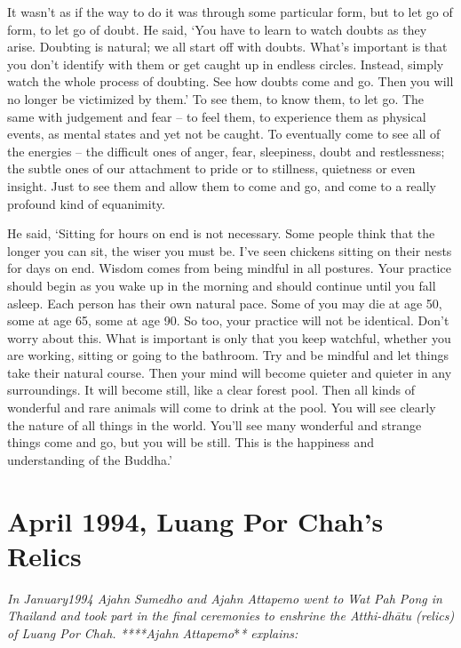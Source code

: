 It wasn't as if the way to do it was through some particular form, but
to let go of form, to let go of doubt. He said, `You have to learn to
watch doubts as they arise. Doubting is natural; we all start off with
doubts. What's important is that you don't identify with them or get
caught up in endless circles. Instead, simply watch the whole process of
doubting. See how doubts come and go. Then you will no longer be
victimized by them.' To see them, to know them, to let go. The same with
judgement and fear -- to feel them, to experience them as physical
events, as mental states and yet not be caught. To eventually come to
see all of the energies -- the difficult ones of anger, fear,
sleepiness, doubt and restlessness; the subtle ones of our attachment to
pride or to stillness, quietness or even insight. Just to see them and
allow them to come and go, and come to a really profound kind of
equanimity.

He said, `Sitting for hours on end is not necessary. Some people think
that the longer you can sit, the wiser you must be. I've seen chickens
sitting on their nests for days on end. Wisdom comes from being mindful
in all postures. Your practice should begin as you wake up in the
morning and should continue until you fall asleep. Each person has their
own natural pace. Some of you may die at age 50, some at age 65, some at
age 90. So too, your practice will not be identical. Don't worry about
this. What is important is only that you keep watchful, whether you are
working, sitting or going to the bathroom. Try and be mindful and let
things take their natural course. Then your mind will become quieter and
quieter in any surroundings. It will become still, like a clear forest
pool. Then all kinds of wonderful and rare animals will come to drink at
the pool. You will see clearly the nature of all things in the world.
You'll see many wonderful and strange things come and go, but you will
be still. This is the happiness and understanding of the Buddha.'

\chapter{April 1994, Luang Por Chah's Relics}

\emph{In January1994 Ajahn Sumedho and Ajahn Attapemo went to Wat Pah
Pong in Thailand and took part in the final ceremonies to enshrine the
Atthi-dhātu (relics) of Luang Por Chah. ****Ajahn Attapemo}*\emph{*
explains:}

